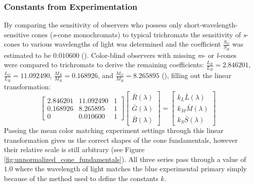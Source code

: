 \documentclass[twocolumn]{article}
\newif\ifinvert
\begin{document}
\subsubsection{Constants from Experimentation}
By comparing the sensitivity of observers who possess only short-wavelength-sensitive cones (\textit{s}-cone monochromats) to typical trichromats the sensitivity of \textit{s}-cones to various wavelengths of light was determined and the coefficient $\frac{S_G}{S_B}$ was estimated to be $0.010600$ (\cite{stockman1999spectral}).  Color-blind observers with missing \textit{m}- or \textit{l}-cones were compared to trichromats to derive the remaining coefficients: $\frac{L_R}{L_B}=2.846201$, $\frac{L_G}{L_B}=11.092490$, $\frac{M_R}{M_B}=0.168926$, and $\frac{M_G}{M_B}=8.265895$
 (\cite{stockman2000spectral}), filling out the linear transformation:
\begin{equation}\label{eq:cone_fundamental_linear_transformation}
    \begin{bmatrix}
        2.846201&11.092490&1\\
        0.168926&8.265895&1\\
        0&0.010600&1
    \end{bmatrix}\begin{bmatrix}
        \bar{R}(\lambda)\\
        \bar{G}(\lambda)\\
        \bar{B}(\lambda)
    \end{bmatrix}=\begin{bmatrix}
        k_L\bar{L}(\lambda)\\
        k_M\bar{M}(\lambda)\\
        k_S\bar{S}(\lambda)
    \end{bmatrix}
\end{equation}
Passing the mean color matching experiment settings through this linear transformation gives us the correct shapes of the cone fundamentals, however their relative scale is still arbitrary (see Figure \ref{fig:unnormalized_cone_fundamentals}).  All three series pass through a value of $1.0$ where the wavelength of light matches the blue experimental primary simply because of the method used to define the constants $k$.
\begin{figure*}[h]
    \ifinvert
        
    \else
        
    \fi
    \caption{Unnormalized cone fundamentals transformed from color matching experiment mean settings using equation \ref{eq:cone_fundamental_linear_transformation}.  Dashed vertical lines indicate the wavelengths of the experimental primary lights; note that all three fundamentals pass through $1.0$ at the wavelength corresponding to the experimental blue primary.  IMAGE LINK, CODE LINK}\label{fig:unnormalized_cone_fundamentals}
\end{figure*}
\end{document}
